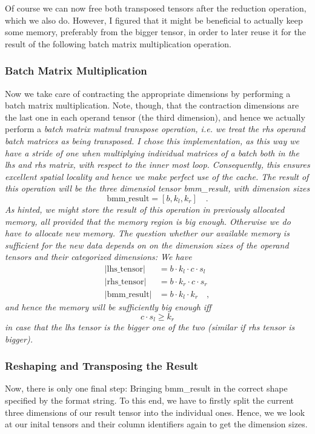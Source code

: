 \documentclass[sigconf]{acmart}
\renewcommand{\texttt}[1]{\begingroup\ttfamily\sloppy\hbadness=10000 #1\endgroup}
\begin{document}
Of course we can now free both transposed tensors after the reduction operation, which we also do. However, I figured that it might be beneficial to actually keep some memory, preferably from the bigger tensor, in order to later reuse it for the result of the following batch matrix multiplication operation.

\subsubsection{Batch Matrix Multiplication}
Now we take care of contracting the appropriate dimensions by performing a batch matrix multiplication. Note, though, that the contraction dimensions are the last one in each operand tensor (the third dimension), and hence we actually perform a \em batch matrix matmul transpose \em operation, i.e. we treat the rhs operand batch matrices as being transposed. I chose this implementation, as this way we have a stride of one when multiplying individual matrices of a batch both in the lhs and rhs matrix, with respect to the inner most loop. Consequently, this ensures excellent spatial locality and hence we make perfect use of the cache. The result of this operation will be the three dimensiol tensor \texttt{bmm\_result}, with dimension sizes
\[ \text{bmm\_result} = [b, k_l, k_r] \quad . \]
As hinted, we might store the result of this operation in previously allocated memory, all provided that the memory region is big enough. Otherwise we do have to allocate new memory. The question whether our available memory is sufficient for the new data depends on on the dimension sizes of the operand tensors and their categorized dimensions: We have
\begin{align*}
|\text{lhs\_tensor}| &= b \cdot k_l \cdot c \cdot s_l \\
|\text{rhs\_tensor}| &= b \cdot k_r \cdot c \cdot s_r \\
|\text{bmm\_result}| &= b \cdot k_l \cdot k_r \quad ,
\end{align*}
and hence the memory will be sufficiently big enough iff
\[ c \cdot s_l \geq k_r \]
in case that the lhs tensor is the bigger one of the two (similar if rhs tensor is bigger).


\subsubsection{Reshaping and Transposing the Result}
Now, there is only one final step: Bringing \texttt{bmm\_result} in the correct shape specified by the format string. To this end, we have to firstly split the current three dimensions of our result tensor into the individual ones. Hence, we we look at our inital tensors and their column identifiers again to get the dimension sizes.
\end{document}
